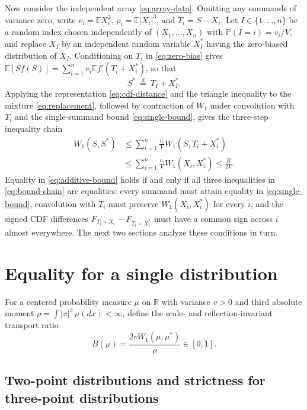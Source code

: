 \documentclass[11pt]{article}
\numberwithin{equation}{section}
\theoremstyle{remark}
\newcommand{\E}{\mathbb E}
\newcommand{\Pp}{\mathbb P}
\newcommand{\R}{\mathbb R}
\begin{document}
Now consider the independent array \eqref{eq:array-data}. Omitting any
summands of variance zero, write $v_i=\E X_i^2$, $\rho_i=\E|X_i|^3$, and
$T_i=S-X_i$. Let $I\in\{1,\ldots,n\}$ be a random index chosen independently
of $(X_1,\ldots,X_n)$ with $\Pp(I=i)=v_i/V$, and replace $X_I$ by an
independent random variable $X_I^*$ having the zero-biased distribution of
$X_I$. Conditioning on $T_i$ in \eqref{eq:zero-bias} gives
$\E[Sf(S)]=\sum_{i=1}^n v_i\E f'(T_i+X_i^*)$, so that
\begin{equation}\label{eq:replacement}
                  S^*\ \stackrel{d}=\ T_I+X_I^*.
\end{equation}
Applying the representation \eqref{eq:cdf-distance} and the triangle
inequality to the mixture \eqref{eq:replacement}, followed by contraction of
$W_1$ under convolution with $T_i$ and the single-summand bound
\eqref{eq:single-bound}, gives the three-step inequality chain
\begin{equation}\label{eq:bound-chain}
 \begin{split}
 W_1(S,S^*)
 &\le\sum_{i=1}^n\frac{v_i}{V}W_1(S,T_i+X_i^*)\\
 &\le\sum_{i=1}^n\frac{v_i}{V}W_1(X_i,X_i^*)
 \le\frac R{2V}.
 \end{split}
\end{equation}
Equality in \eqref{eq:additive-bound} holds if and only if all three
inequalities in \eqref{eq:bound-chain} are equalities: every summand must
attain equality in \eqref{eq:single-bound}, convolution with $T_i$ must
preserve $W_1(X_i,X_i^*)$ for every $i$, and the signed CDF differences
$F_{T_i+X_i}-F_{T_i+X_i^*}$ must have a common sign across $i$ almost
everywhere. The next two sections analyze these conditions in turn.

\section{Equality for a single distribution}\label{sec:single-equality}

For a centered probability measure $\mu$ on $\R$ with variance $v>0$ and
third absolute moment $\rho=\int|x|^3\,\mu(dx)<\infty$, define the scale- and
reflection-invariant transport ratio
\[
                 B(\mu)=\frac{2v W_1(\mu,\mu^*)}{\rho}\in[0,1].
\]

\subsection{Two-point distributions and strictness for three-point distributions}
\end{document}
